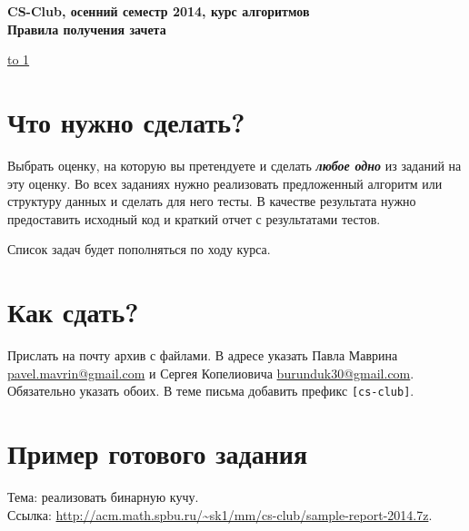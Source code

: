 \documentclass[12pt]{article}
\def\t{\texttt}
\def\myindent{\hspace*{\parindent}}
\newcommand\Section[1]{\vspace*{-1em}\section{#1}}
\begin{document}
\begin{center}
  {\Large \bf CS-Club, осенний семестр 2014, курс алгоритмов} \\ 
  \vspace{0.5em}
  {\Large \bf Правила получения зачета} \\
\end{center}

\vspace{-1em}
\noindent \underline{\hbox to 1\textwidth{{ } \hfil{ } \hfil{ } }}

\Section{Что нужно сделать?}

\myindent{}Выбрать оценку, на которую вы претендуете и сделать {\bf\it любое одно} из заданий на эту оценку.
Во всех заданиях нужно реализовать предложенный алгоритм
или структуру данных и сделать для него тесты.
В качестве результата нужно предоставить
исходный код и краткий отчет с результатами тестов.

\vspace*{0.5em}
Список задач будет пополняться по ходу курса.

\Section{Как сдать?}

Прислать на почту архив с файлами. В адресе указать Павла Маврина \url{pavel.mavrin@gmail.com}
и Сергея Копелиовича \url{burunduk30@gmail.com}. Обязательно указать обоих.
В теме письма добавить префикс \t{[cs-club]}.

\Section{Пример готового задания}

Тема: реализовать бинарную кучу. \\
Ссылка: \url{http://acm.math.spbu.ru/~sk1/mm/cs-club/sample-report-2014.7z}.
              
\end{document}

